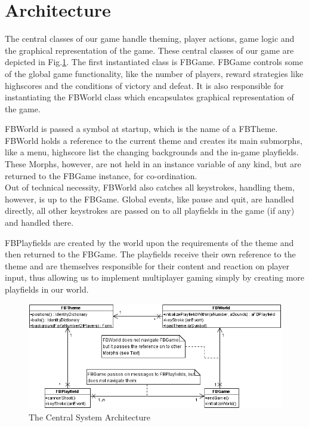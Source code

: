 \section{Architecture}
The central classes of our game handle theming, player actions, game logic 
and the graphical representation of the game. These central
classes of our game are depicted in Fig.\ref{fig:architecture}.
%
The first instantiated class is FBGame. FBGame controls some of the global 
game functionality, like the number of players, reward strategies like 
highscores and the conditions of victory and defeat. It is also responsible 
for instantiating the FBWorld class which encapsulates graphical 
representation of the game.

FBWorld is passed a symbol at startup, which is the name of a FBTheme. FBWorld 
holds a reference to the current theme and creates its main submorphs, like
a menu, highscore list the changing backgrounds and the in-game playfields.
These Morphs, however, are not held in an instance variable of any kind, but 
are returned to the FBGame instance, for co-ordination.\\
Out of technical necessity, FBWorld also catches all keystrokes, handling them, 
however, is up to the FBGame. Global events, like pause and quit, are handled 
directly, all other keystrokes are passed on to all playfields in the game (if any)
and handled there.

FBPlayfields are created by the world upon the requirements of the theme
and then returned to the FBGame. The playfields receive their own reference 
to the theme and are themselves responsible for their content and reaction on 
player input, thus allowing us to implement multiplayer gaming simply by creating 
more playfields in our world.
%
\begin{figure}[bt]
  \begin{center}
    \includegraphics[width=0.6\linewidth]{images/architecture.png}
  \end{center}
  \caption{The Central System Architecture}
  \label{fig:architecture}
\end{figure}


